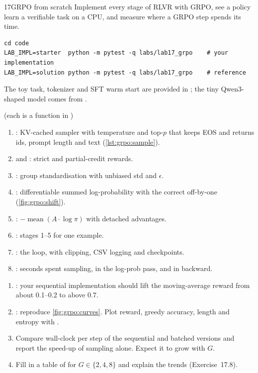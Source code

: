 \begin{labbox}{17}{GRPO from scratch}
Implement every stage of RLVR with GRPO, see a policy learn a verifiable task on a CPU, and
measure where a GRPO step spends its time.

\begin{lstlisting}[style=shell]
cd code
LAB_IMPL=starter  python -m pytest -q labs/lab17_grpo    # your implementation
LAB_IMPL=solution python -m pytest -q labs/lab17_grpo    # reference
\end{lstlisting}
The toy task, tokenizer and SFT warm start are provided in ; the tiny
Qwen3-shaped model comes from .

 (each is a function in )
\begin{enumerate}
\item {}: KV-cached sampler with temperature and top-$p$ that keeps EOS and returns
ids, prompt length and text (\cref{lst:grpo:sample}).
\item {} and : strict and partial-credit rewards.
\item {}: group standardisation with unbiased std and $\epsilon$.
\item {}: differentiable summed log-probability with the correct
off-by-one (\cref{fig:grpo:shift}).
\item {}: $-\operatorname{mean}(A\cdot\log\pi)$ with detached advantages.
\item {}: stages 1--5 for one example.
\item {}: the loop, with clipping, CSV logging and checkpoints.
\item {}: seconds spent sampling, in the log-prob pass, and in backward.
\end{enumerate}

\begin{enumerate}
\item {}: your
sequential implementation should lift the moving-average reward from about 0.1--0.2 to above 0.7.
\item {}: reproduce \cref{fig:grpo:curves}. Plot
reward, greedy accuracy, length and entropy with .
\item Compare wall-clock per step of the sequential and batched versions and report the
speed-up of sampling alone. Expect it to grow with $G$.
\item Fill in a table of  for $G\in\{2,4,8\}$ and explain the
trends (Exercise~17.8).
\end{enumerate}


\end{labbox}
